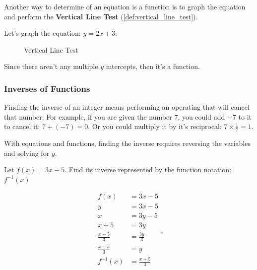 Another way to determine of an equation is a function is to graph the equation
and perform the \textbf{Vertical Line Test} (\ref{def:vertical_line_test}).

\begin{example}
  \label{exm:vertical_line_test}

  Let's graph the equation: $y = 2x + 3$:

  \begin{figure}[H]
    \centering
    \caption{Vertical Line Test}
    \label{fig:vertical_line_test}
  \end{figure}

  Since there aren't any multiple $y$ intercepts, then it's a function.
\end{example}


\subsubsection{Inverses of Functions}
\label{sub_sub_sec:inverses_of_functions}

Finding the inverse of an integer means performing an operating that will cancel
that number. For example, if you are given the number $7$, you could add $-7$ to
it to cancel it: $7 + (-7) = 0$. Or you could multiply it by it's reciprocal:
$7 \times \frac{1}{7} = 1$.

With equations and functions, finding the inverse requires reversing the
variables and solving for $y$.

\begin{example}
  \label{exm:inverses_of_functions}

  Let $f(x) = 3x - 5$. Find its inverse represented by the function notation:
  $f^{-1}(x)$ 

  \begin{equation}
    \label{eqt:inverses_of_functions}
    \begin{split}
      f(x) &= 3x - 5 \\
      y &= 3x - 5 \\
      x &= 3y - 5 \\
      x + 5 &= 3y \\
      \frac{x + 5}{3} &= \frac{3y}{3} \\
      \frac{x + 5}{3} &= y \\
      f^{-1}(x) &= \frac{x + 5}{3} \\
    \end{split}
  .\end{equation}
\end{example}

